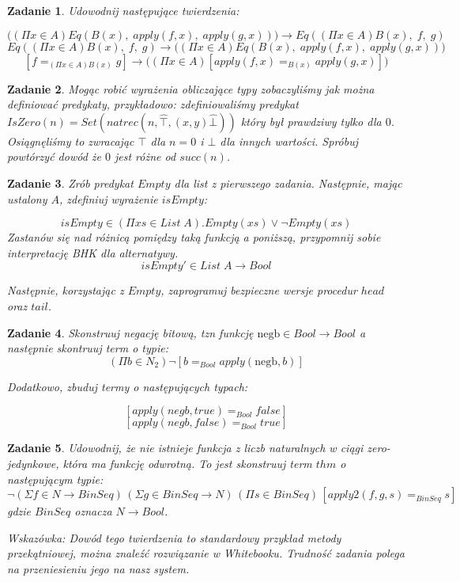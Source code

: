 \documentclass[11pt, a4paper]{article}
\newtheorem{zadanie}{Zadanie}
\begin{document}
\begin{zadanie}
 Udowodnij następujące twierdzenia:

\[
 \Big( (\Pi x \in A) Eq(B(x),\; apply(f,x),\; apply(g,x)) \Big) \to Eq( (\Pi x \in A)B(x),\; f,\; g)
\]
\[
 Eq( (\Pi x \in A)B(x),\; f,\; g) \to \Big( (\Pi x \in A) Eq(B(x),\; apply(f,x),\; apply(g,x)) \Big)
\]
\[
 [f =_{(\Pi x \in A)B(x)} g] \to \Big( (\Pi x \in A) [apply(f,x) =_{B(x)} apply(g,x)] \Big)
\]


\end{zadanie}


\begin{zadanie}
Mogąc robić wyrażenia obliczające typy zobaczyliśmy jak można definiować predykaty, przykładowo: zdefiniowaliśmy
predykat $IsZero(n) = Set(natrec(n, \widehat{\top}, (x,y)\widehat{\bot}))$ który był prawdziwy
tylko dla $0$. Osiągnęliśmy to zwracając $\top$ dla $n=0$ i $\bot$ dla
innych wartości. Spróbuj powtórzyć dowód że $0$ jest różne od $succ(n)$.
\end{zadanie}

\begin{zadanie}
Zrób predykat $Empty$ dla list z pierwszego zadania. Następnie, mając ustalony $A$, zdefiniuj wyrażenie $isEmpty$:

\[
 isEmpty \in (\Pi xs \in List\;A). Empty(xs) \vee \neg Empty(xs)
\]
Zastanów się nad różnicą pomiędzy taką funkcją a poniższą, przypomnij sobie interpretację BHK dla alternatywy.
\[
 isEmpty' \in List\;A \to Bool
\]

Następnie, korzystając z $Empty$, zaprogramuj bezpieczne wersje procedur $head$ oraz $tail$.
\end{zadanie}


\begin{zadanie}
 Skonstruuj negację bitową, tzn funkcję $\mbox{negb} \in Bool \to Bool$ a następnie skontruuj term o typie:
\[
 (\Pi b \in N_2) \neg [b =_{Bool} apply(\mbox{negb},b)]
\]

Dodatkowo, zbuduj termy o następujących typach:

\[
 [apply(negb, true) =_{Bool} false]
\]
\[
 [apply(negb, false) =_{Bool} true]
\]

\end{zadanie}


\begin{zadanie}
 Udowodnij, że nie istnieje funkcja z liczb naturalnych w ciągi zero-jedynkowe, która ma funkcję odwrotną.
To jest skonstruuj
 term $thm$ o następującym typie:
\[
 \neg (\Sigma f \in N \to BinSeq)\, (\Sigma g \in BinSeq \to N)\,
(\Pi s \in BinSeq)\,[ apply2(f, g, s) =_{BinSeq} s ]
\]
gdzie $BinSeq$ oznacza $N \to Bool$.

Wskazówka: Dowód tego twierdzenia to standardowy przykład metody przekątniowej, można znaleźć rozwiązanie w Whitebooku.
Trudność zadania polega na przeniesieniu jego na nasz system.
\end{zadanie}
\end{document}
